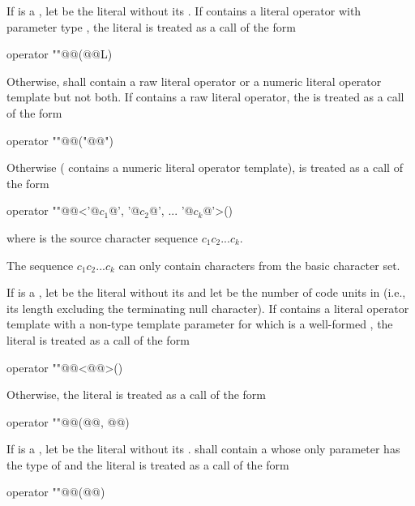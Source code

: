 \pnum
If  is a , let  be the
literal without its . If  contains a literal operator
with parameter type , the literal  is treated as a call of
the form
\begin{codeblock}
operator ""@@(@@L)
\end{codeblock}
Otherwise,  shall contain a raw literal operator
or a numeric literal operator template but not both.
If  contains a raw literal operator,
the   is treated as a call of the form
\begin{codeblock}
operator ""@@("@@")
\end{codeblock}
Otherwise ( contains a numeric literal operator template),
 is treated as a call of the form
\begin{codeblock}
operator ""@@<'@$c_1$@', '@$c_2$@', ... '@$c_k$@'>()
\end{codeblock}
where  is the source character sequence $c_1c_2...c_k$.
\begin{note}
The sequence
$c_1c_2...c_k$ can only contain characters from the basic character set.
\end{note}

\pnum
If  is a ,
let  be the literal without its 
and let  be the number of code units in 
(i.e., its length excluding the terminating null character).
If  contains a literal operator template with
a non-type template parameter for which  is
a well-formed ,
the literal  is treated as a call of the form
\begin{codeblock}
operator ""@@<@@>()
\end{codeblock}
Otherwise, the literal  is treated as a call of the form
\begin{codeblock}
operator ""@@(@@, @@)
\end{codeblock}

\pnum
If  is a , let  be the
literal without its .
 shall contain a  whose only parameter has
the type of  and the
literal  is treated as a call
of the form
\begin{codeblock}
operator ""@@(@@)
\end{codeblock}

